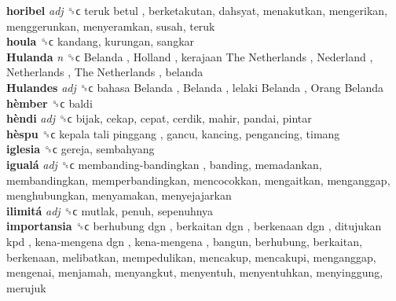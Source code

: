 \textbf{horibel} \emph{adj}  ␝ϲ   teruk betul , berketakutan, dahsyat, menakutkan, mengerikan, menggerunkan, menyeramkan, susah, teruk  \\
\textbf{houla} ␝ϲ  kandang, kurungan, sangkar  \\
\textbf{Hulanda} \emph{n}  ␝ϲ   Belanda ,  Holland ,  kerajaan The Netherlands ,  Nederland ,  Netherlands ,  The Netherlands , belanda  \\
\textbf{Hulandes} \emph{adj}  ␝ϲ   bahasa Belanda ,  Belanda ,  lelaki Belanda ,  Orang Belanda   \\
\textbf{hèmber} ␝ϲ  baldi  \\
\textbf{hèndi} \emph{adj}  ␝ϲ  bijak, cekap, cepat, cerdik, mahir, pandai, pintar  \\
\textbf{hèspu} ␝ϲ   kepala tali pinggang , gancu, kancing, pengancing, timang  \\
\textbf{iglesia} ␝ϲ  gereja, sembahyang  \\
\textbf{igualá} \emph{adj}  ␝ϲ   membanding-bandingkan , banding, memadankan, membandingkan, memperbandingkan, mencocokkan, mengaitkan, menganggap, menghubungkan, menyamakan, menyejajarkan  \\
\textbf{ilimitá} \emph{adj}  ␝ϲ  mutlak, penuh, sepenuhnya  \\
\textbf{importansia} ␝ϲ   berhubung dgn ,  berkaitan dgn ,  berkenaan dgn ,  ditujukan kpd ,  kena-mengena dgn ,  kena-mengena , bangun, berhubung, berkaitan, berkenaan, melibatkan, mempedulikan, mencakup, mencakupi, menganggap, mengenai, menjamah, menyangkut, menyentuh, menyentuhkan, menyinggung, merujuk  \\
